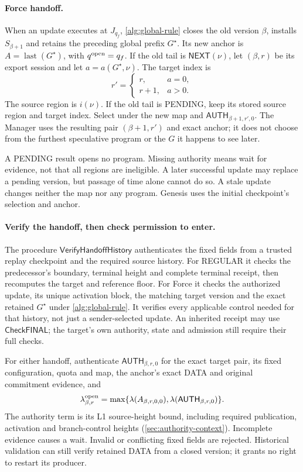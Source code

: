 \documentclass[11pt,a4paper]{article}
\newcommand{\tagg}[1]{\ensuremath{\mathsf{#1}}}
\begin{document}
\paragraph{Force handoff.}
\label{sec:retry-slot}
When an update executes at $J_{q_f}$, \cref{alg:global-rule} closes the
old version $\beta$, installs $S_{\beta+1}$ and retains the preceding
global prefix $G^\star$. Its new anchor is
$A=\operatorname{last}(G^\star)$, with $q^{\rm open}=q_f$.
If the old tail is $\tagg{NEXT}(\nu)$, let $(\beta,r)$ be its export
session and let $a=a(G^\star,\nu)$. The target index is
\[
 r'=\begin{cases}
 r,&a=0,\\
 r+1,&a>0.
 \end{cases}
\]
The source region is $i(\nu)$. If the old tail is PENDING, keep its
stored source region and target index. Select under the new map and
$\tagg{AUTH}_{\beta+1,r',0}$. The Manager uses the resulting pair
$(\beta+1,r')$ and exact anchor; it does not choose from the furthest
speculative program or the $G$ it happens to see later.

A PENDING result opens no program. Missing authority means wait for
evidence, not that all regions are ineligible. A later successful update
may replace a pending version, but passage of time alone cannot do so.
A stale update changes neither the map nor any program.
Genesis uses the initial checkpoint's selection and anchor.

\paragraph{Verify the handoff, then check permission to enter.}
\label{sec:verify-handoff}
The procedure $\tagg{VerifyHandoffHistory}$ authenticates the fixed
fields from a trusted replay checkpoint and the required source
history. For REGULAR it checks the predecessor's boundary, terminal
height and complete terminal receipt, then recomputes the target and
reference floor. For Force it checks the authorized update, its unique
activation block, the matching target version and the exact retained
$G^\star$ under \cref{alg:global-rule}. It verifies every applicable
control needed for that history, not just a sender-selected update.
An inherited receipt may use \tagg{CheckFINAL}; the target's own
authority, state and admission still require their full checks.

For either handoff, authenticate $\tagg{AUTH}_{\beta,r,0}$ for the exact
target pair, its fixed configuration, quota and map,
the anchor's exact DATA and original commitment evidence, and
\[
 \lambda^{\rm open}_{\beta,r}
 =\max\{\lambda(A_{\beta,r,0,0}),
         \lambda(\tagg{AUTH}_{\beta,r,0})\}.
\]
The authority term is its L1 source-height bound, including required
publication, activation and branch-control heights (\cref{sec:authority-context}).
Incomplete evidence causes a wait. Invalid or conflicting fixed fields
are rejected. Historical validation can still verify retained DATA
from a closed version; it grants no right to restart its producer.
\end{document}

